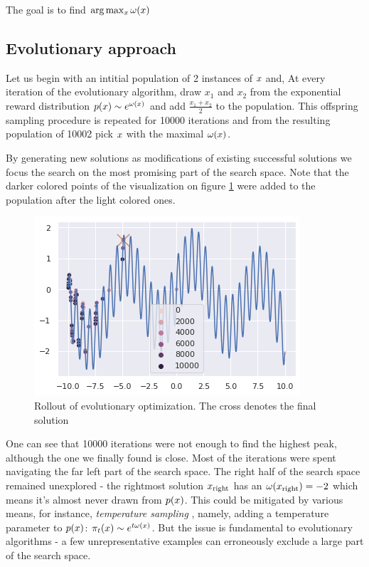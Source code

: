 The goal is to find $ \arg\max_x \omega(x) $

\subsection{Evolutionary approach}

Let us begin with an intitial population of 2 instances of $ x $ and, At every iteration of the evolutionary algorithm, draw $ x_1 $ and $ x_2 $ from the exponential reward distribution $p(x) \sim e^{\omega(x)}$ and add $ \frac{x_1 + x_2}{2} $ to the population.
This offspring sampling procedure is repeated for 10000 iterations and from the resulting population of 10002 pick $ x $ with the maximal $ \omega(x) $.

By generating new solutions as modifications of existing successful solutions we focus the search on the most promising part of the search space. 
Note that the darker colored points of the visualization on figure \ref{fig:neuropt-search} were added to the population after the light colored ones. 

\begin{figure}
    \centering
    \includegraphics[width=0.8\linewidth]{images/neuropt2.png}
    \caption{Rollout of evolutionary optimization. The cross denotes the final solution}
    \label{fig:neuropt-search}
\end{figure}

One can see that 10000 iterations were not enough to find the highest peak, although the one we finally found is close. Most of the iterations were spent navigating the far left part of the search space. 
The right half of the search space remained unexplored - the rightmost solution $ x_\text{right} $ has an $ \omega(x_\text{right})=-2 $ which means it's almost never drawn from $ p(x) $. 
This could be mitigated by various means, for instance, \emph{temperature sampling} \cite{holtzman2019curious}, namely, adding a temperature parameter to $ p(x) $: $\pi_t(x) \sim e^{t\omega(x)}$.
But the issue is fundamental to evolutionary algorithms - a few unrepresentative examples can erroneously exclude a large part of the search space.

